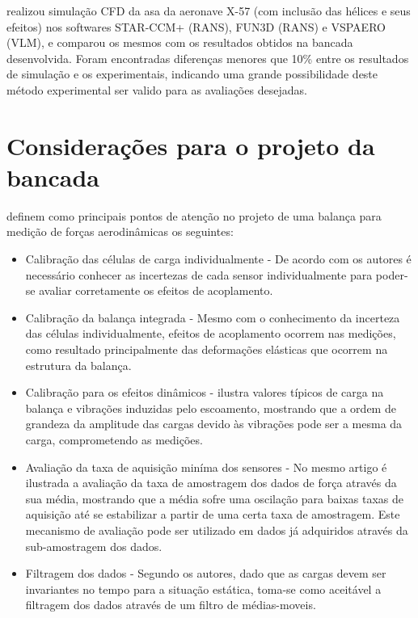 \cite{stoll2015comparison} realizou simulação CFD da asa da aeronave X-57 (com inclusão das hélices e seus efeitos) nos softwares STAR-CCM+ (RANS), FUN3D (RANS) e VSPAERO (VLM), e comparou os mesmos com os resultados obtidos na bancada desenvolvida. Foram encontradas diferenças menores que 10\% entre os resultados de simulação e os experimentais, indicando uma grande possibilidade deste método experimental ser valido para as avaliações desejadas.

\section{Considerações para o projeto da bancada}

\cite{gonzalez2011components} definem como principais pontos de atenção no projeto de uma balança para medição de forças aerodinâmicas os seguintes:

\begin{itemize}
    \item Calibração das células de carga individualmente - De acordo com os autores é necessário conhecer as incertezas de cada sensor individualmente para poder-se avaliar corretamente os efeitos de acoplamento. 
    \item Calibração da balança integrada - Mesmo com o conhecimento da incerteza das células individualmente, efeitos de acoplamento ocorrem nas medições, como resultado principalmente das deformações elásticas que ocorrem na estrutura da balança.
    \item Calibração para os efeitos dinâmicos - \cite{gonzalez2011components} ilustra valores típicos de carga na balança e vibrações induzidas pelo escoamento, mostrando que a ordem de grandeza da amplitude das cargas devido às vibrações pode ser a mesma da carga, comprometendo as medições.
    \item Avaliação da taxa de aquisição miníma dos sensores - No mesmo artigo é ilustrada a avaliação da taxa de amostragem dos dados de força através da sua média, mostrando que a média sofre uma oscilação para baixas taxas de aquisição até se estabilizar a partir de uma certa taxa de amostragem. Este mecanismo de avaliação pode ser utilizado em dados já adquiridos através da sub-amostragem dos dados.
    \item Filtragem dos dados - Segundo os autores, dado que as cargas devem ser invariantes no tempo para a situação estática, toma-se como aceitável a filtragem dos dados através de um filtro de médias-moveis.
\end{itemize}

